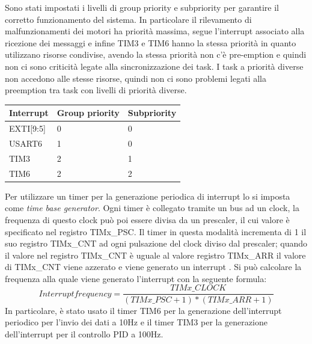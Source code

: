 Sono stati impostati i livelli di group priority e subpriority per garantire il corretto funzionamento del sistema. In particolare il rilevamento di malfunzionamenti dei motori ha priorità massima, segue l'interrupt associato alla ricezione dei messaggi e infine TIM3 e TIM6 hanno la stessa priorità in quanto utilizzano risorse condivise, avendo la stessa priorità non c'è pre-emption e quindi non ci sono criticità legate alla sincronizzazione dei task. I task a priorità diverse non accedono alle stesse risorse, quindi non ci sono problemi legati alla preemption tra task con livelli di priorità diverse.

\begin{table}[H]
\centering
\begin{tabular}{lll}
\hline
\textbf{Interrupt} & \textbf{Group priority} & \textbf{Subpriority} \\ \hline
EXTI[9:5]          & 0                       & 0                    \\ \hline
USART6             & 1                       & 0                    \\ \hline
TIM3               & 2                       & 1                    \\ \hline
TIM6               & 2                       & 2                    \\ \hline
\end{tabular}
\end{table}

Per utilizzare un timer per la generazione periodica di interrupt lo si imposta come \textit{time base generator}. Ogni timer è collegato tramite un bus ad un clock, la frequenza di questo clock può poi essere divisa da un prescaler, il cui valore è specificato nel registro TIMx\_PSC. Il timer in questa modalità incrementa di 1 il suo registro TIMx\_CNT ad ogni pulsazione del clock diviso dal prescaler; quando il valore nel registro TIMx\_CNT è uguale al valore registro TIMx\_ARR il valore di TIMx\_CNT viene azzerato e viene generato un interrupt \cite{STM32_timer_cookbook}.
Si può calcolare la frequenza alla quale viene generato l'interrupt con la seguente formula:
\begin{displaymath}
Interrupt frequency = \frac{TIMx\_CLOCK}{(TIMx\_PSC + 1)*(TIMx\_ARR + 1)}
\end{displaymath}
In particolare, è stato usato il timer TIM6 per la generazione dell'interrupt periodico per l'invio dei dati a 10Hz e il timer TIM3 per la generazione dell'interrupt per il controllo PID a 100Hz.

